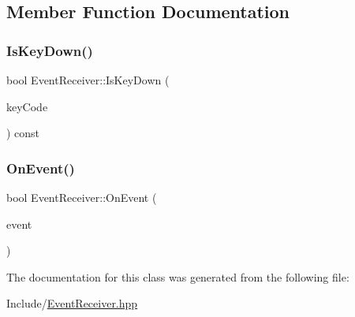 \subsection{Member Function Documentation}
\mbox{\label{class_event_receiver_aa10f8caeb3685a8d8f24f322bdf56ffb}} 
\subsubsection{\texorpdfstring{IsKeyDown()}{IsKeyDown()}}
{\footnotesize\ttfamily bool Event\+Receiver\+::\+Is\+Key\+Down (\begin{DoxyParamCaption}\item[{irr\+::\+E\+K\+E\+Y\+\_\+\+C\+O\+DE}]{key\+Code }\end{DoxyParamCaption}) const\hspace{0.3cm}{\ttfamily [inline]}}

\mbox{\label{class_event_receiver_a48ced4db276e50f997de19b2b1e50fdf}} 
\subsubsection{\texorpdfstring{OnEvent()}{OnEvent()}}
{\footnotesize\ttfamily bool Event\+Receiver\+::\+On\+Event (\begin{DoxyParamCaption}\item[{const irr\+::\+S\+Event \&}]{event }\end{DoxyParamCaption})\hspace{0.3cm}{\ttfamily [inline]}}



The documentation for this class was generated from the following file\+:\begin{DoxyCompactItemize}
\item 
Include/\mbox{\hyperlink{_event_receiver_8hpp}{Event\+Receiver.\+hpp}}\end{DoxyCompactItemize}
